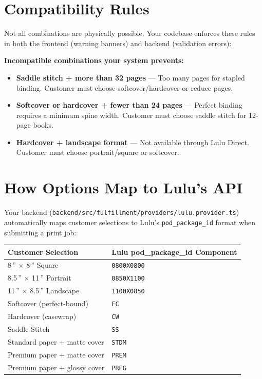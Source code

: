 \documentclass[12pt, letterpaper, oneside]{book}
\begin{document}
\section{Compatibility Rules}

Not all combinations are physically possible. Your codebase enforces these rules in both the frontend (warning banners) and backend (validation errors):

\begin{warningbox}
\textbf{Incompatible combinations your system prevents:}
\begin{itemize}[leftmargin=1.5em, itemsep=2pt]
  \item \textbf{Saddle stitch + more than 32 pages} --- Too many pages for stapled binding. Customer must choose softcover/hardcover or reduce pages.
  \item \textbf{Softcover or hardcover + fewer than 24 pages} --- Perfect binding requires a minimum spine width. Customer must choose saddle stitch for 12-page books.
  \item \textbf{Hardcover + landscape format} --- Not available through Lulu Direct. Customer must choose portrait/square or softcover.
\end{itemize}
\end{warningbox}

\section{How Options Map to Lulu's API}

Your backend (\texttt{backend/src/fulfillment/providers/lulu.provider.ts}) automatically maps customer selections to Lulu's \texttt{pod\_package\_id} format when submitting a print job:

\begin{table}[H]
\centering
\small
\begin{tabularx}{\textwidth}{lX}
\toprule
\textbf{Customer Selection} & \textbf{Lulu pod\_package\_id Component} \\
\midrule
8\,'' $\times$ 8\,'' Square & \texttt{0800X0800} \\
8.5\,'' $\times$ 11\,'' Portrait & \texttt{0850X1100} \\
11\,'' $\times$ 8.5\,'' Landscape & \texttt{1100X0850} \\
Softcover (perfect-bound) & \texttt{FC} \\
Hardcover (casewrap) & \texttt{CW} \\
Saddle Stitch & \texttt{SS} \\
Standard paper + matte cover & \texttt{STDM} \\
Premium paper + matte cover & \texttt{PREM} \\
Premium paper + glossy cover & \texttt{PREG} \\
\bottomrule
\end{tabularx}
\end{table}
\end{document}
